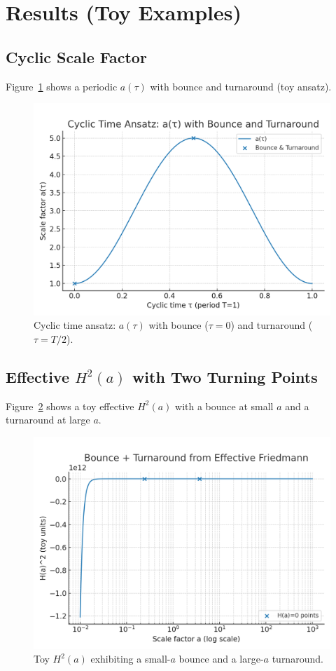 \documentclass[12pt]{article}
\begin{document}
\section{Results (Toy Examples)}
\subsection{Cyclic Scale Factor}
Figure~\ref{fig:atau} shows a periodic $a(\tau)$ with bounce and turnaround (toy ansatz).

\begin{figure}[h]
\centering
\includegraphics[width=0.7\linewidth]{figures/plot_a_tau.png}
\caption{Cyclic time ansatz: $a(\tau)$ with bounce ($\tau=0$) and turnaround ($\tau=T/2$).}
\label{fig:atau}
\end{figure}

\subsection{Effective $H^2(a)$ with Two Turning Points}
Figure~\ref{fig:h2a} shows a toy effective $H^2(a)$ with a bounce at small $a$ and a turnaround at large $a$.

\begin{figure}[h]
\centering
\includegraphics[width=0.7\linewidth]{figures/plot_H2.png}
\caption{Toy $H^2(a)$ exhibiting a small-$a$ bounce and a large-$a$ turnaround.}
\label{fig:h2a}
\end{figure}
\end{document}
